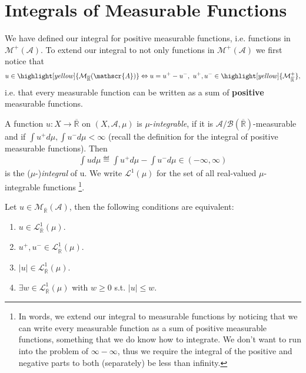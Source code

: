 \section{Integrals of Measurable Functions}
We have defined our integral for positive measurable functions, i.e. functions in \(\mathcal{M}^{+}(\mathscr{A})\). To extend our integral
to not only functions in \(\mathcal{M}^{+}(\mathscr{A})\) we first notice that
\begin{align}
    u \in \highlight[yellow]{\mathcal{M}_{\overline{\mathbb{R}}}(\mathscr{A})} \Leftrightarrow 
    u = u^+ - u^-, \ u^+, u^-\in \highlight[yellow]{\mathcal{M}^{+}_{\overline{\mathbb{R}}}},
\end{align}
i.e. that every measurable function can be written as a sum of \textbf{positive} measurable functions.

\begin{definition}[\(\mu\)-integrable]
    A function \(u:X \rightarrow \overline{\mathbb{R}}\) on \((X, \mathscr{A}, \mu)\) is \(\mu\)-\emph{integrable}, if it is 
    \(\mathscr{A}/\mathscr{B}(\overline{\mathbb{R}})\)-measurable and if \(\int u^+ d\mu, \int u^-d\mu < \infty\) (recall the definition
    for the integral of positive measurable functions). Then
    \begin{align}
        \int ud\mu \eqdef \int u^+d\mu - \int u^-d\mu \in (-\infty, \infty)
    \end{align}
    is the (\(\mu\)-)\emph{integral} of u. We write \(\mathcal{L}^1(\mu)\) for the set of all real-valued \(\mu\)-integrable functions
    \footnote{In words, we extend our integral to  measurable functions by noticing that we can write every measurable 
    function as a sum of positive measurable functions, something that we do know how to integrate. We don't want to run into the problem
    of \(\infty - \infty\), thus we require the integral of the positive and negative parts to both (separately) be less than infinity.}.
\end{definition}
\begin{theorem}
    Let \(u\in \mathcal{M}_{\overline{\mathbb{R}}}(\mathscr{A})\), then the following conditions are equivalent:
    \begin{enumerate}[label=(\roman*)]
        \item \(u \in \mathcal{L}^{1}_{\overline{\mathbb{R}}}(\mu)\).
        \item \(u^+, u^- \in \mathcal{L}^{1}_{\overline{\mathbb{R}}}(\mu)\).
        \item \(\vert u\vert \in \mathcal{L}^{1}_{\overline{\mathbb{R}}}(\mu)\).
        \item \(\exists w \in \mathcal{L}^{1}_{\overline{\mathbb{R}}}(\mu)\) with \(w\geq 0\) s.t. \(\vert u \vert \leq w\).
    \end{enumerate}
\end{theorem}
